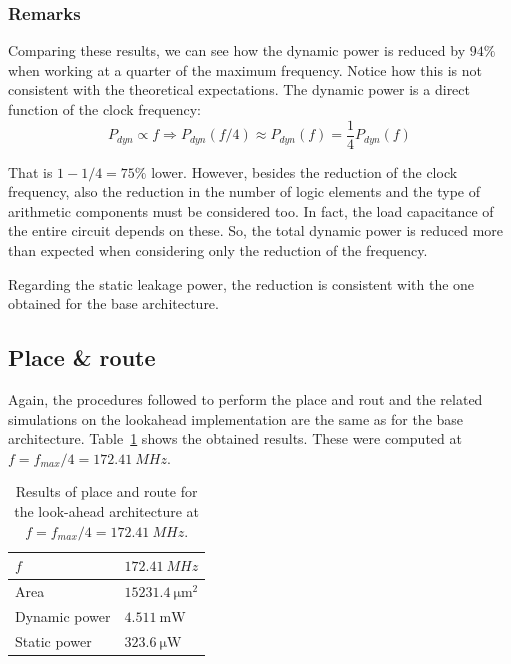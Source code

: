 \documentclass[a4paper]{article}
\begin{document}
\subsubsection{Remarks}

Comparing these results, we can see how the dynamic power is reduced by $94\%$ when working at a quarter of the maximum frequency. Notice how this is not consistent with the theoretical expectations. The dynamic power is a direct function of the clock frequency:
\begin{equation*}
    P_{dyn} \propto f \Rightarrow P_{dyn} \left( f/4 \right) \approx P_{dyn} \left( f \right) = \frac{1}{4} P_{dyn} \left( f \right)
\end{equation*}

That is $1-1/4 = 75\%$ lower. However, besides the reduction of the clock frequency, also the reduction in the number of logic elements and the type  of arithmetic components must be considered too. In fact, the load capacitance of the entire circuit depends on these. So, the total dynamic power is reduced more than expected when considering only the reduction of the frequency.

Regarding the static leakage power, the reduction is consistent with the one obtained for the base architecture.

\subsection{Place \& route}
Again, the procedures followed to perform the place and rout and the related simulations on the lookahead implementation are the same as for the base architecture. Table~\ref{tab:lookahead_post_pnr} shows the obtained results. These were computed at $f = f_{max}/4 = \SI{172.41}{MHz}$. 

\begin{table}[hbtp]
    \centering
    \begin{tabular}{l|l|}
    \hline
    \multicolumn{1}{|l|}{$f$}           & $\SI{172.41}{MHz}$                \\ \hline
    \multicolumn{1}{|l|}{Area}          & $\SI{15231.4}{\micro\meter^2}$    \\ \hline
    \multicolumn{1}{|l|}{Dynamic power} & $\SI{4.511}{\milli\watt}$        \\ \hline
    \multicolumn{1}{|l|}{Static power}  & $\SI{323.6}{\micro\watt}$          \\ \hline
    \end{tabular}
    \caption{Results of place and route for the look-ahead architecture at $f = f_{max}/4 = \SI{172.41}{MHz}$.}
    \label{tab:lookahead_post_pnr}
\end{table}
\end{document}
